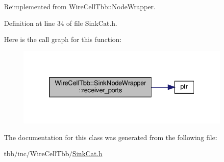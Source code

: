 Reimplemented from \hyperlink{class_wire_cell_tbb_1_1_node_wrapper_ac3c636904e4d3d1df0939906dd8853c7}{Wire\+Cell\+Tbb\+::\+Node\+Wrapper}.



Definition at line 34 of file Sink\+Cat.\+h.

Here is the call graph for this function\+:
\nopagebreak
\begin{figure}[H]
\begin{center}
\leavevmode
\includegraphics[width=301pt]{class_wire_cell_tbb_1_1_sink_node_wrapper_a09c612e3812953234b60b9e184c598cd_cgraph}
\end{center}
\end{figure}


The documentation for this class was generated from the following file\+:\begin{DoxyCompactItemize}
\item 
tbb/inc/\+Wire\+Cell\+Tbb/\hyperlink{_sink_cat_8h}{Sink\+Cat.\+h}\end{DoxyCompactItemize}
